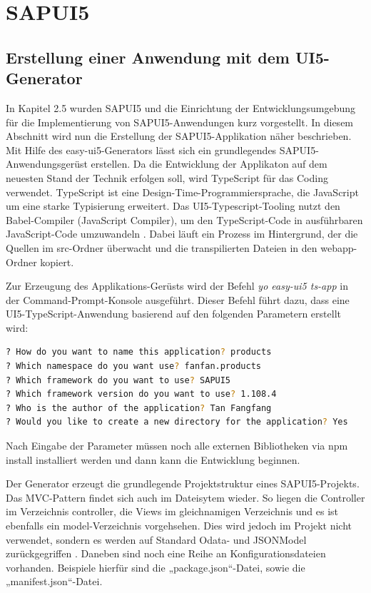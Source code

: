 \section{SAPUI5}
\subsection{Erstellung einer Anwendung mit dem UI5-Generator}
In Kapitel 2.5 wurden SAPUI5 und die Einrichtung der Entwicklungsumgebung für die Implementierung von SAPUI5-Anwendungen kurz vorgestellt. In diesem Abschnitt wird nun die Erstellung der SAPUI5-Applikation näher beschrieben.
Mit Hilfe des easy-ui5-Generators lässt sich ein grundlegendes SAPUI5-Anwendungsgerüst erstellen. Da die Entwicklung der Applikaton auf dem neuesten Stand der Technik erfolgen soll, wird TypeScript für das Coding verwendet. TypeScript ist eine Design-Time-Programmiersprache, die JavaScript um eine starke Typisierung erweitert. Das UI5-Typescript-Tooling nutzt den Babel-Compiler (JavaScript Compiler), um den TypeScript-Code in ausführbaren JavaScript-Code umzuwandeln \cite{pm:gswt}. Dabei läuft ein Prozess im Hintergrund, der die Quellen im src-Ordner überwacht und die transpilierten Dateien in den webapp-Ordner kopiert. 

Zur Erzeugung des Applikations-Gerüsts wird der Befehl \textit{yo easy-ui5 ts-app} in der Command-Prompt-Konsole ausgeführt. Dieser Befehl führt dazu, dass eine UI5-TypeScript-Anwendung basierend auf den folgenden Parametern erstellt wird:

\begin{lstlisting}[language=bash, caption=Eingabe der Paramtern des UI5-Generators]
? How do you want to name this application? products
? Which namespace do you want use? fanfan.products 
? Which framework do you want to use? SAPUI5 
? Which framework version do you want to use? 1.108.4 
? Who is the author of the application? Tan Fangfang 
? Would you like to create a new directory for the application? Yes
\end{lstlisting}

Nach Eingabe der Parameter müssen noch alle externen Bibliotheken via npm install installiert werden und dann kann die Entwicklung beginnen.

Der Generator erzeugt die grundlegende Projektstruktur eines SAPUI5-Projekts. Das MVC-Pattern findet sich auch im Dateisytem wieder. So liegen die Controller im Verzeichnis controller, die Views im gleichnamigen Verzeichnis und es ist ebenfalls ein model-Verzeichnis vorgehsehen. Dies wird jedoch im Projekt nicht verwendet, sondern es werden auf Standard Odata- und JSONModel zurückgegriffen \cite{sud:ao}. Daneben sind noch eine Reihe an Konfigurationsdateien vorhanden. Beispiele hierfür sind die „package.json“-Datei, sowie die „manifest.json“-Datei. 

